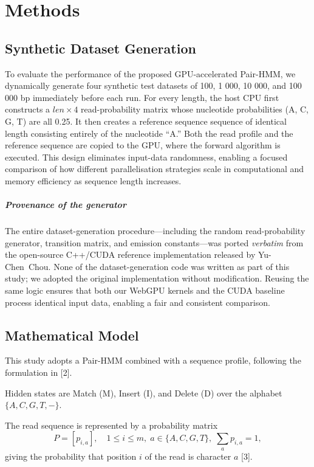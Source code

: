 \documentclass[PhD]{PHlab-thesis}
\begin{document}
\chapter{Methods}

\section{Synthetic Dataset Generation}\label{sec:dataset}
To evaluate the performance of the proposed GPU-accelerated Pair-HMM, we
dynamically generate four synthetic test datasets of 100, 1 000, 10 000,
and 100 000 bp immediately before each run.
For every length, the host CPU first constructs a
$\textit{len}\!\times\!4$ read-probability matrix whose nucleotide
probabilities (A, C, G, T) are all 0.25.
It then creates a reference sequence sequence of identical length consisting
entirely of the nucleotide “A.”
Both the read profile and the reference sequence are copied to the GPU, where the
forward algorithm is executed.
This design eliminates input-data randomness, enabling a focused
comparison of how different parallelisation strategies scale in
computational and memory efficiency as sequence length increases.

\paragraph{Provenance of the generator}%
The entire dataset-generation procedure—including the random
read-probability generator, transition matrix, and emission constants—was
ported \emph{verbatim} from the open-source C++/CUDA reference
implementation released by Yu-Chen~Chou\cite{chou2024}.
None of the dataset-generation code was written as part of this study; we
adopted the original implementation without modification.
Reusing the same logic ensures that both our WebGPU kernels and the CUDA
baseline process identical input data, enabling a fair and consistent
comparison.


\section{Mathematical Model}
This study adopts a Pair-HMM combined with a sequence profile, following
the formulation in [2].

Hidden states are Match (M), Insert (I), and Delete (D) over the alphabet
$\{A,C,G,T,-\}$.

The read sequence is represented by a probability matrix
\[
P = [p_{i,a}], \quad 1 \le i \le m,\;
a \in \{A,C,G,T\},\;
\sum_a p_{i,a} = 1,
\]
giving the probability that position $i$ of the read is character $a$
[3].
\end{document}
